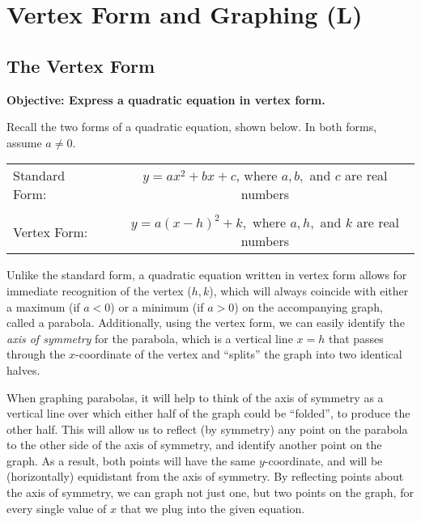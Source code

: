 \documentclass[12pt]{book}
\theoremstyle{definition}
\begin{document}
\section{Vertex Form and Graphing (L)}
\subsection{The Vertex Form}
{\bf Objective: Express a quadratic equation in vertex form.}\par
Recall the two forms of a quadratic equation, shown below.  In both forms, assume $a\neq 0$.
\begin{center}
\begin{tabular}{lcc}
Standard Form: & & $y=ax^2+bx+c$, where $a,b,$ and $c$ are real numbers\\
&&\\
Vertex Form: & & $y=a(x-h)^2+k,$ where $a,h,$ and $k$ are real numbers
\end{tabular}
\end{center}
Unlike the standard form, a quadratic equation written in vertex form allows for immediate recognition of the vertex ($h,k$), which will always coincide with either a maximum (if $a<0$) or a minimum (if $a>0$) on the accompanying graph, called a parabola. Additionally, using the vertex form, we can easily identify the \textit{axis of symmetry} for the parabola, which is a vertical line $x=h$ that passes through the $x$-coordinate of the vertex and ``splits'' the graph into two identical halves.\par
When graphing parabolas, it will help to think of the axis of symmetry as a vertical line over which either half of the graph could be ``folded'', to produce the other half.  This will allow us to reflect (by symmetry) any point on the parabola to the other side of the axis of symmetry, and identify another point on the graph.  As a result, both points will have the same $y$-coordinate, and will be (horizontally) equidistant from the axis of symmetry.  By reflecting points about the axis of symmetry, we can graph not just one, but two points on the graph, for every single value of $x$ that we plug into the given equation.
\end{document}
